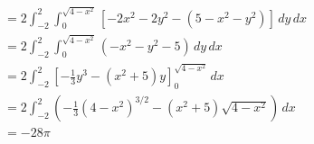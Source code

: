 \documentclass{article}
\begin{document}
\begin{align*}
                                             & = 2 \int_{-2}^2 \int_0^{\sqrt{4 - x^2}} [-2 x^2 - 2 y^2 - (5 - x^2 - y^2)] \,dy \,dx                                                 \\
                                             & = 2 \int_{-2}^2 \int_0^{\sqrt{4 - x^2}} (-x^2 - y^2 - 5) \,dy \,dx                                                                   \\
                                             & = 2 \int_{-2}^2 \left[ -\frac{1}{3} y^3 - (x^2 + 5) y \right]_0^{\sqrt{4 - x^2}} \,dx                                                \\
                                             & = 2 \int_{-2}^2 \left( -\frac{1}{3} (4 - x^2)^{3 / 2} - (x^2 + 5) \sqrt{4 - x^2} \right) \,dx                                        \\
                                             & = -28 \pi
\end{align*}

\setcounter{subsubsection}{34}
\subsubsection{}
\end{document}
